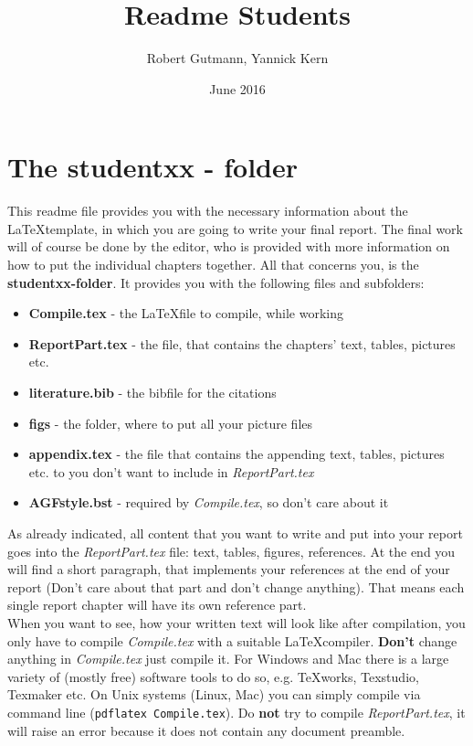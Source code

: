 \documentclass[12pt,a4paper,notitlepage]{scrreprt}
\title{Readme Students}
\author{Robert Gutmann, Yannick Kern}
\date{June 2016}
\begin{document}
\setcounter{tocdepth}{2}


\maketitle

\section{The studentxx - folder}

This readme file provides you with the necessary information about the \LaTeX template, in which you are going to write your final report. The final work will of course be done by the editor, who is provided with more information on how to put the individual chapters together. All that concerns you, is the \textbf{studentxx-folder}. It provides you with the following files and subfolders: 

\begin{itemize}
	\item \textbf{Compile.tex} - the \LaTeX file to compile, while working
	\item \textbf{ReportPart.tex} - the file, that contains the chapters' text, tables, pictures etc.
	\item \textbf{literature.bib} - the bibfile for the citations
	\item \textbf{figs} - the folder, where to put all your picture files
	\item \textbf{appendix.tex} - the file that contains the appending text, tables, pictures etc. to you don't want to include in \textit{ReportPart.tex}
	\item \textbf{AGFstyle.bst} - required by \textit{Compile.tex}, so don't care about it
\end{itemize}

As already indicated, all content that you want to write and put into your report goes into the \textit{ReportPart.tex} file: text, tables, figures, references. At the end you will find a short paragraph, that implements your references at the end of your report (Don't care about that part and don't change anything). That means each single report chapter will have its own reference part.\\

When you want to see, how your written text will look like after compilation, you only have to compile \textit{Compile.tex} with a suitable \LaTeX compiler. \textbf{Don't} change anything in \textit{Compile.tex} just compile it. For Windows and Mac there is a large variety of (mostly free) software tools to do so, e.g. TeXworks, Texstudio, Texmaker etc. On Unix systems (Linux, Mac) you can simply compile via command line (\verb#pdflatex Compile.tex#). Do \textbf{not} try to compile \textit{ReportPart.tex}, it will raise an error because it does not contain any document preamble.\\
\end{document}

